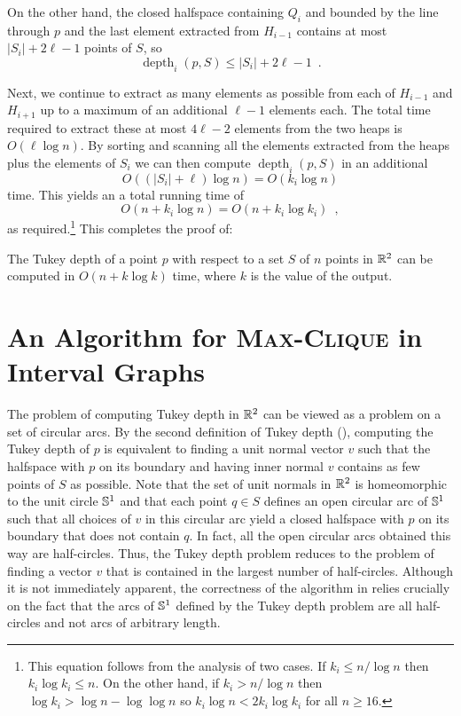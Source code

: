 \documentclass[charterfonts,lotsofwhite]{patmorin}
\DeclareMathOperator{\td}{depth}
\begin{document}
On the other hand, the closed halfspace containing $Q_i$ and bounded by the line through
$p$ and the last element extracted from $H_{i-1}$ contains at most
$|S_i|+2\ell -1$ points of $S$, so
\[
  \td_i(p,S) \le |S_i| + 2\ell-1  \enspace .
\]

Next, we continue to extract as many elements as possible from each of
$H_{i-1}$ and $H_{i+1}$ up to a maximum of an additional $\ell-1$
elements each. The total time required to extract these at most
$4\ell-2$ elements from the two heaps is $O(\ell\log n)$.  By sorting and
scanning all the elements extracted from the heaps plus the elements of
$S_i$ we can then compute $\td_i(p,S)$ in an additional
\[
     O((|S_i|+\ell)\log n) = O(k_i\log n)
\] 
time.  This yields an a total running time of 
\[  
   O(n + k_i\log n) = O(n + k_i\log k_i) \enspace ,
\]
as required.\footnote{This equation follows from the analysis of two cases. If
$k_i \le n/\log n$ then $k_i\log k_i \le n$.  On the other hand, if $k_i >
n/\log n$ then $\log k_i > \log n - \log\log n$ so $k_i\log n <
2k_i\log k_i$ for all $n\ge 16$.}  This completes the proof of:

\begin{thm}
The Tukey depth of a point $p$ with respect to a set $S$ of $n$ points
in $\mathbb{R}^2$ can be computed in $O(n + k\log k)$ time, where
$k$ is the value of the output.
\end{thm}

\section{An Algorithm for \textsc{Max-Clique} in Interval Graphs}

The problem of computing Tukey depth in $\mathbb{R}^2$ can be viewed as a
problem on a set of circular arcs.  By the second definition of Tukey
depth (), computing the Tukey depth of $p$ is
equivalent to finding a unit normal vector $v$ such that the halfspace
with $p$ on its boundary and having inner normal $v$ contains as few
points of $S$ as possible.  Note that the set of unit normals in
$\mathbb{R}^2$ is homeomorphic to the unit circle $\mathbb{S}^1$ and that each point
$q\in S$ defines an open circular arc of $\mathbb{S}^1$ such that all choices
of $v$ in this circular arc yield a closed halfspace with $p$ on its
boundary that does not contain $q$.  In fact, all the open circular
arcs obtained this way are half-circles.  Thus, the Tukey depth problem
reduces to the problem of finding a vector $v$ that is contained in
the largest number of half-circles. Although it is not immediately
apparent, the correctness of the algorithm
in  relies crucially on the fact that the arcs of $\mathbb{S}^1$
defined by the Tukey depth problem are all half-circles and not arcs
of arbitrary length.
\end{document}
